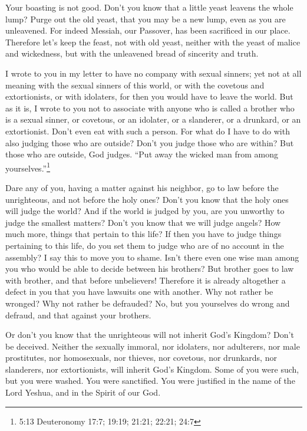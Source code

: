 \myverse{}Your boasting is not good. Don’t you know that a little yeast leavens
the whole lump?
\myverse{}Purge out the old yeast, that you may be a new lump, even as you are unleavened.
For indeed Messiah, our Passover, has been sacrificed in our place.
\myverse{}Therefore let’s keep the feast, not with old yeast, neither with the yeast of
malice and wickedness, but with the unleavened bread of sincerity and truth.

\myverse{}I wrote to you in my letter to have no company with sexual sinners;
\myverse{}yet not at all meaning with the sexual sinners of this world, or with the
covetous and extortionists, or with idolaters, for then you would have to leave the world.
\myverse{}But as it is, I wrote to you not to associate with anyone who is called a
brother who is a sexual sinner, or covetous, or an idolater, or a slanderer, or a drunkard, or an extortionist.
Don’t even eat with such a person.
\myverse{}For what do I have to do with also judging those who are outside? Don’t you
judge those who are within?
\myverse{}But those who are outside, God judges. “Put away the wicked man from among
yourselves.”\footnote{5:13 Deuteronomy 17:7;
	19:19;
	21:21;
	22:21;
	24:7}


\mychapter{} \myverse*{}Dare any of you, having a matter against his neighbor, go to law
before the unrighteous, and not before the holy ones?
\myverse{}Don’t you know that the holy ones will judge the world? And if the world is
judged by you, are you unworthy to judge the smallest matters?
\myverse{}Don’t you know that we will judge angels? How much more, things that pertain
to this life?
\myverse{}If then you have to judge things pertaining to this life, do you set them to
judge who are of no account in the assembly?
\myverse{}I say this to move you to shame. Isn’t there even one wise man among you who
would be able to decide between his brothers?
\myverse{}But brother goes to law with brother, and that before unbelievers!
\myverse{}Therefore it is already altogether a defect in you that you have lawsuits one
with another. Why not rather be wronged? Why not rather be defrauded?
\myverse{}No, but you yourselves do wrong and defraud, and that against your brothers.

\myverse{}Or don’t you know that the unrighteous will not inherit God’s Kingdom?
Don’t be deceived. Neither the sexually immoral, nor idolaters, nor adulterers, nor male prostitutes,
nor homosexuals,
\myverse{}nor thieves, nor covetous, nor drunkards, nor slanderers, nor extortionists,
will inherit God’s Kingdom.
\myverse{}Some of you were such, but you were washed. You were sanctified. You were
justified in the name of the Lord Yeshua, and in the Spirit of our God.

